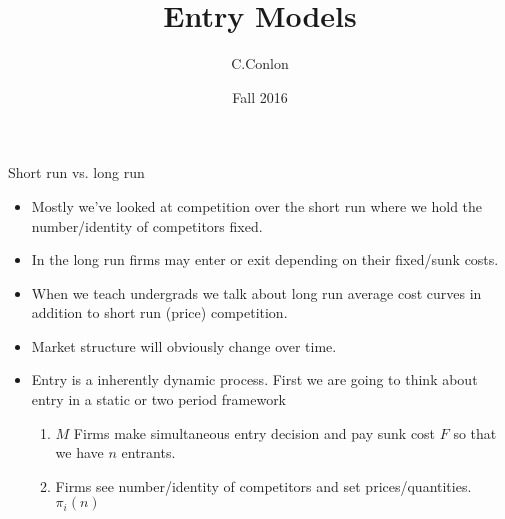 \def\beamerclassoptions{[xcolor=pdftex,dvipsnames,table,mathserif]}


\usepackage[english]{babel}
\usepackage{pgf,pgfarrows,pgfnodes,pgfautomata,pgfheaps}
\usepackage{multirow,array}
\usepackage{amsmath,amssymb,setspace}
\usepackage[latin1]{inputenc}
\usepackage[T1]{fontenc}
\usepackage{relsize}
\usepackage[absolute,overlay]{textpos} 
\newenvironment{reference}[2]{%
  \begin{textblock*}{\textwidth}(#1,#2) 
      \footnotesize\it\bgroup\color{red!50!black}}{\egroup\end{textblock*}} 



\title []{Entry Models}
\author{C.Conlon }
\date{Fall 2016}


\begin{frame}
\titlepage
\end{frame}



\begin{frame}{Short run vs. long run}
\begin{itemize}
\item Mostly we've looked at competition over the \alert{short run} where we hold the number/identity of competitors fixed.
\item In the \alert{long run} firms may enter or exit depending on their fixed/sunk costs.
\item When we teach undergrads we talk about \alert{long run average cost curves} in addition to short run (price) competition.
\item Market structure will obviously change over time.
\item Entry is a inherently dynamic process. First we are going to think about entry in a static or two period framework
\begin{enumerate}
\item $M$ Firms make simultaneous entry decision and pay sunk cost $F$ so that we have $n$ entrants.
\item Firms see number/identity of competitors and set prices/quantities. $\pi_i(n)$
\end{enumerate}
\end{itemize}
\end{frame} 


